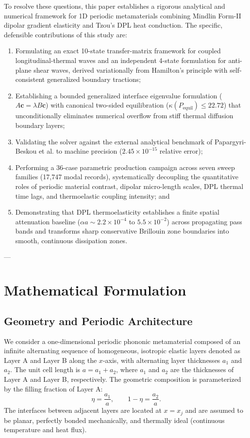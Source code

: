 \documentclass[11pt,a4paper]{article}
\begin{document}
To resolve these questions, this paper establishes a rigorous analytical and numerical framework for 1D periodic metamaterials combining Mindlin Form-II dipolar gradient elasticity and Tzou's DPL heat conduction. The specific, defensible contributions of this study are:
\begin{enumerate}
    \item Formulating an exact 10-state transfer-matrix framework for coupled longitudinal-thermal waves and an independent 4-state formulation for anti-plane shear waves, derived variationally from Hamilton's principle with self-consistent generalized boundary tractions;
    \item Establishing a bounded generalized interface eigenvalue formulation ($A\mathbf{c} = \lambda B\mathbf{c}$) with canonical two-sided equilibration ($\kappa(P_{\text{equil}}) \le 22.72$) that unconditionally eliminates numerical overflow from stiff thermal diffusion boundary layers;
    \item Validating the solver against the external analytical benchmark of Papargyri-Beskou et al. \cite{papargyribeskou2009wave} to machine precision ($2.45 \times 10^{-15}$ relative error);
    \item Performing a 36-case parametric production campaign across seven sweep families (17,747 modal records), systematically decoupling the quantitative roles of periodic material contrast, dipolar micro-length scales, DPL thermal time lags, and thermoelastic coupling intensity; and
    \item Demonstrating that DPL thermoelasticity establishes a finite spatial attenuation baseline ($\alpha a \sim 2.2 \times 10^{-4}$ to $5.5 \times 10^{-2}$) across propagating pass bands and transforms sharp conservative Brillouin zone boundaries into smooth, continuous dissipation zones.
\end{enumerate}

---

\section{Mathematical Formulation}
\label{sec:math}

\subsection{Geometry and Periodic Architecture}
We consider a one-dimensional periodic phononic metamaterial composed of an infinite alternating sequence of homogeneous, isotropic elastic layers denoted as Layer A and Layer B along the $x$-axis, with alternating layer thicknesses $a_1$ and $a_2$. The unit cell length is $a = a_1 + a_2$, where $a_1$ and $a_2$ are the thicknesses of Layer A and Layer B, respectively. The geometric composition is parameterized by the filling fraction of Layer A:
\begin{equation}
\eta = \frac{a_1}{a}, \qquad 1 - \eta = \frac{a_2}{a}.
\label{eq:filling_fraction}
\end{equation}
The interfaces between adjacent layers are located at $x = x_j$ and are assumed to be planar, perfectly bonded mechanically, and thermally ideal (continuous temperature and heat flux).
\end{document}
